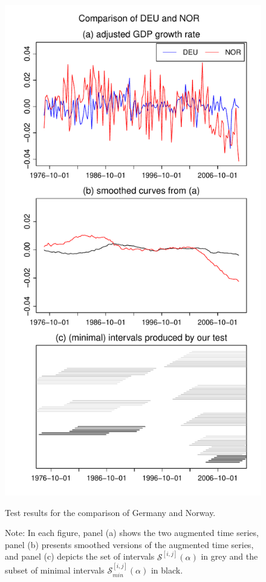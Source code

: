 \documentclass[a4paper,12pt]{article}
\begin{document}
\begin{figure}[t!]
\begin{minipage}[t]{0.49\textwidth}
\includegraphics[width=\textwidth]{Plots/DEU_vs_NOR}
\caption{Test results for the comparison of Germany and Norway.}\label{fig:Germany:Norway}
\end{minipage}
\caption*{Note: In each figure, panel (a) shows the two augmented time series, panel (b) presents smoothed versions of the augmented time series, and panel (c) depicts the set of intervals $\mathcal{S}^{[i,j]}(\alpha)$ in grey and the subset of minimal intervals $\mathcal{S}^{[i,j]}_{min}(\alpha)$ in black.}
\end{figure}
\end{document}
